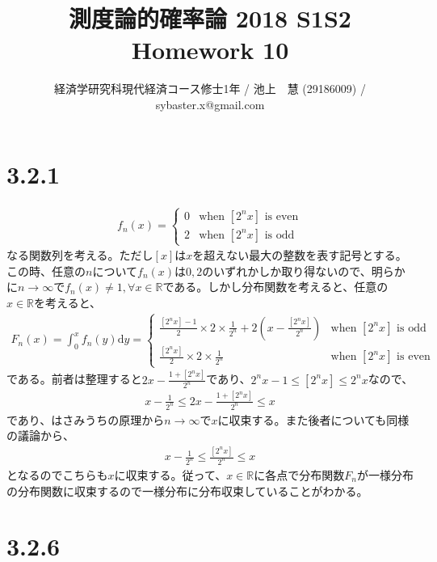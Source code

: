 \documentclass{article}
\begin{document}
\title{測度論的確率論 2018 S1S2 \\ 
Homework 10}
\author{経済学研究科現代経済コース修士1年 / 池上　慧 (29186009) / sybaster.x@gmail.com}
\maketitle

\section{3.2.1}
\begin{align*}
	f_n(x) = \begin{cases} 0 & \text{when $\left[ 2^n x \right]$ is even}\\[8pt]
	2 & \text{when $\left[ 2^n x \right]$ is odd}
	\end{cases}
\end{align*}
なる関数列を考える。ただし$\left[ x \right]$は$x$を超えない最大の整数を表す記号とする。この時、任意の$n$について$f_n(x)$は$0,2$のいずれかしか取り得ないので、明らかに$n \to \infty$で$f_n(x) \neq 1 ,\forall x \in \mathbb{R}$である。しかし分布関数を考えると、任意の$x \in \mathbb{R}$を考えると、
\begin{align*}
	F_n(x) = \int_0^x f_n(y) \mathrm{d}y = \begin{cases} \frac{\left[ 2^n x \right] - 1}{2} \times 2 \times \frac{1}{2^n} + 2\left( x - \frac{\left[ 2^n x \right]}{2^n} \right) & \text{when $\left[ 2^n x \right]$ is odd} \\[8pt]
	\frac{\left[ 2^n x \right] }{2} \times 2 \times \frac{1}{2^n}  & \text{when $\left[ 2^n x \right]$ is even}
	\end{cases}
\end{align*}
である。前者は整理すると$2x - \frac{1 + \left[ 2^n x \right]}{2^n}$であり、$2^n x - 1 \leq \left[ 2^n x \right] \leq 2^n x$なので、
\begin{align*}
	x - \frac{1}{2^n}\leq 2x - \frac{1 + \left[ 2^n x \right]}{2^n} \leq x
\end{align*}
であり、はさみうちの原理から$n \to \infty$で$x$に収束する。また後者についても同様の議論から、
\begin{align*}
	x-\frac{1}{2^n} \leq \frac{\left[ 2^n x \right]}{2^n} \leq x
\end{align*}
となるのでこちらも$x$に収束する。従って、$x \in \mathbb{R}$に各点で分布関数$F_n$が一様分布の分布関数に収束するので一様分布に分布収束していることがわかる。

\section{3.2.6}
\end{document}
